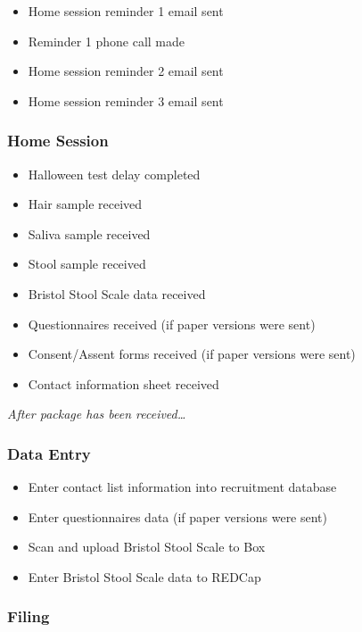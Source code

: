 \documentclass[]{book}
\providecommand{\tightlist}{%
  \setlength{\itemsep}{0pt}\setlength{\parskip}{0pt}}
\begin{document}
\begin{itemize}
\tightlist
\item
  Home session reminder 1 email sent
\item
  Reminder 1 phone call made
\item
  Home session reminder 2 email sent
\item
  Home session reminder 3 email sent
\end{itemize}

\hypertarget{home-session}{%
\subsubsection{Home Session}\label{home-session}}

\begin{itemize}
\tightlist
\item
  Halloween test delay completed
\item
  Hair sample received
\item
  Saliva sample received
\item
  Stool sample received
\item
  Bristol Stool Scale data received
\item
  Questionnaires received (if paper versions were sent)
\item
  Consent/Assent forms received (if paper versions were sent)
\item
  Contact information sheet received
\end{itemize}

\emph{After package has been received\ldots{}}

\hypertarget{data-entry-1}{%
\subsubsection{Data Entry}\label{data-entry-1}}

\begin{itemize}
\tightlist
\item
  Enter contact list information into recruitment database
\item
  Enter questionnaires data (if paper versions were sent)
\item
  Scan and upload Bristol Stool Scale to Box
\item
  Enter Bristol Stool Scale data to REDCap
\end{itemize}

\hypertarget{filing-2}{%
\subsubsection{Filing}\label{filing-2}}
\end{document}
